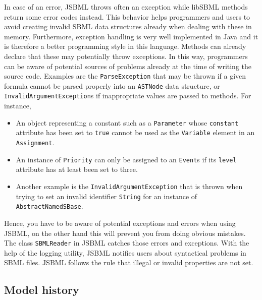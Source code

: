 In case of an error, JSBML
%
throws often an exception while libSBML methods
return some error codes instead. This behavior helps programmers and users to
avoid creating invalid SBML data structures already when dealing with these in
memory. Furthermore, exception handling is very well implemented in Java and it
is therefore a better programming style in this language. Methods can already
declare that these may potentially throw exceptions. In this way, programmers
can be aware of potential sources of problems already at the time of writing the
source code. Examples are the \texttt{ParseException}
%
that may be thrown if a given formula cannot be parsed properly into an
\texttt{ASTNode}
%
data structure, or \texttt{InvalidArgumentException}s
%
if inappropriate values are passed to methods. For instance,
\begin{itemize}
 \item An object representing a constant such as a
 \texttt{Parameter} whose \texttt{constant} attribute has been set to
\texttt{true} cannot be used as the \texttt{Variable} element in an
\texttt{Assignment}.
%
%
%
%
 \item An instance of \texttt{Priority} can only be assigned to an \texttt{Event}s if its \texttt{level} attribute has at least been set to three.
 \item Another example is the \texttt{InvalidArgumentException} that
is thrown when trying to set an invalid identifier \texttt{String} for an instance of \texttt{AbstractNamedSBase}.
%
\end{itemize}
Hence, you have to be aware of potential
exceptions and errors when using JSBML,
%
on the other hand this will prevent you from doing obvious mistakes. The class
\texttt{SBMLReader} in JSBML catches those errors and exceptions. With the help
of the logging utility, JSBML notifies users about syntactical problems in SBML
files. JSBML follows the rule that illegal or invalid properties are not set.


\subsection{Model history}

